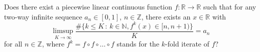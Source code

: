 Does there exist a piecewise linear continuous function $f:\mathbb{R}\to \mathbb{R}$ such that for any two-way infinite sequence $a_n\in[0,1]$, $n\in\mathbb{Z}$, there exists an $x\in\mathbb{R}$ with
\[
\limsup_{K\to \infty} \frac{\#\{k\le K\,:\, k\in\mathbb{N},f^k(x)\in[n,n+1)\}}{K}=a_n
\]for all $n\in\mathbb{Z}$, where $f^k=f\circ f\circ \dots\circ f$ stands for the $k$-fold iterate of $f$?